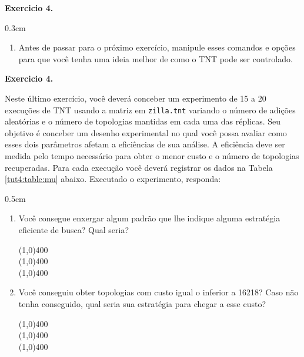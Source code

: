 \begin{refsection}
\begin{blackBlock}{\textbf{Exercicio 4.}}
\begin {myindentpar}{0.3cm}
\begin{enumerate}[\itshape i.]
\item{Antes de passar para o próximo exercício, manipule esses comandos e opções para que você tenha uma ideia melhor de como o TNT pode ser controlado.}

	\end{enumerate}
	\end{myindentpar}

\end{blackBlock}




\begin{blackBlock}{\textbf{Exercicio 4.}}\label{tut4:ex:4.9}

Neste último exercício, você deverá conceber um experimento de 15 a 20 execuções de TNT usando a matriz em \texttt{zilla.tnt} variando o número de adições aleatórias e o número de topologias mantidas em cada uma das réplicas. Seu objetivo é conceber um desenho experimental no qual você possa avaliar como esses dois parâmetros afetam a eficiências de sua análise. A eficiência deve ser medida pelo tempo necessário para obter o menor custo e o número de topologias recuperadas. Para cada execução você deverá registrar os dados na Tabela \ref{tut4:table:mu} abaixo. Executado o experimento, responda:

	\begin {myindentpar}{0.5cm}
	\begin{enumerate}[\itshape a.]
		\item{Você consegue enxergar algum padrão que lhe indique alguma estratégia eficiente de busca? Qual seria?}
	\begin{center}
	\line(1,0){400}\\
	\line(1,0){400}\\
	\line(1,0){400}\\
	\end{center}

		\item{Você conseguiu obter topologias com custo igual o inferior a 16218? Caso não tenha conseguido, qual seria sua estratégia para chegar a esse custo?}
	\begin{center}
	\line(1,0){400}\\
	\line(1,0){400}\\
	\line(1,0){400}\\
	\end{center}


	\end{enumerate}
	\end{myindentpar}


\end{blackBlock}
\end{refsection}
